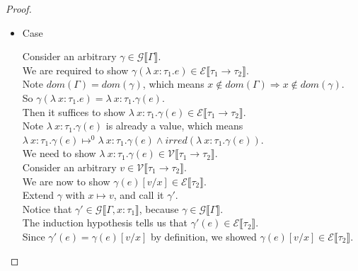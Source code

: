 \documentclass{article}
\begin{document}
\begin{proof}
\begin{itemize}
\begin{itemize}
\newpage  

\item Case \begin{mathpar}  \end{mathpar}
  Consider an arbitrary $\gamma \in \mathcal{G} \llbracket \Gamma \rrbracket$.\\
  We are required to show $\gamma(\lambda~x:\tau_1.e) \in \mathcal{E} \llbracket \tau_1 \rightarrow \tau_2 \rrbracket$.\\
  Note $dom(\Gamma) = dom(\gamma)$, which means $x \notin dom(\Gamma) \Rightarrow x \notin dom(\gamma)$.\\
  So $\gamma(\lambda~x:\tau_1.e) = \lambda~x:\tau_1.\gamma(e)$.\\
  Then it suffices to show $\lambda~x:\tau_1.\gamma(e) \in \mathcal{E} \llbracket \tau_1 \rightarrow \tau_2 \rrbracket$.\\
  Note $\lambda~x:\tau_1.\gamma(e)$ is already a value, which means\\
  $\lambda~x:\tau_1.\gamma(e) \mapsto^0 \lambda~x:\tau_1.\gamma(e) \wedge irred(\lambda~x:\tau_1.\gamma(e))$.\\
  We need to show $\lambda~x:\tau_1.\gamma(e) \in \mathcal{V} \llbracket \tau_1 \rightarrow \tau_2 \rrbracket$.\\
  Consider an arbitrary $v \in \mathcal{V} \llbracket \tau_1 \rightarrow \tau_2 \rrbracket$.\\
  We are now to show $\gamma(e)[v/x] \in \mathcal{E} \llbracket \tau_2 \rrbracket$.\\
  Extend $\gamma$ with $x \mapsto v$, and call it $\gamma'$.\\
  Notice that $\gamma' \in \mathcal{G} \llbracket \Gamma, x:\tau_1 \rrbracket$, because $\gamma \in \mathcal{G} \llbracket \Gamma \rrbracket$.\\
  The induction hypothesis tells us that $\gamma'(e) \in \mathcal{E} \llbracket \tau_2 \rrbracket$.\\
  Since $\gamma'(e) = \gamma(e)[v/x]$ by definition, we showed $\gamma(e)[v/x] \in \mathcal{E} \llbracket \tau_2 \rrbracket$.\\

\newpage    


\end{itemize}
\end{itemize}
\end{proof}
\end{document}
